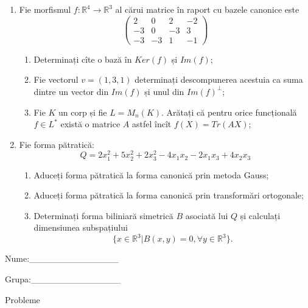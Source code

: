 \documentclass{article}
\begin{document}
\begin{enumerate}
 \item Fie morfismul $f:\mathbb{R}^4 \to \mathbb{R}^3$ al cărui matrice în raport cu bazele canonice este
$$\begin{pmatrix}
2&0&2&-2\\
-3&0&-3&3\\
-3&-3&1&-1
\end{pmatrix}$$

\begin{enumerate}
\item Determinați cîte o bază în $Ker(f)$ și $Im(f)$;
\item Fie vectorul $v=(1,3,1)$ determinați descompunerea acestuia ca suma dintre un vector din $Im(f)$ și unul din $Im(f)^\perp$;
\item Fie $K$ un corp și fie $L=M_n(K)$. Arătați că pentru orice funcțională $f \in L^*$ există o matrice $A$ astfel încît $f(X)=Tr(AX)$;
\end{enumerate}
\item Fie forma pătratică:
$$Q= 2x_1^2+5x_2^2+2x_3^2-4x_1x_2-2x_1x_3+4x_2x_3$$

\begin{enumerate}
\item Aduceți forma pătratică la forma canonică prin metoda Gauss;
\item Aduceți forma pătratică la forma canonică prin transformări ortogonale;
\item Determinați forma biliniară simetrică $B$ asociată lui $Q$ și calculați dimensiunea subspațiului
$$\{x \in \mathbb{R}^3 | B(x,y)=0,\forall y \in \mathbb{R}^3\}.$$

\end{enumerate}
\end{enumerate}
\newpage
\begin{flushright}
Nume:\_\_\_\_\_\_\_\_\_\_\_\_\_\_
 
 
Grupa:\_\_\_\_\_\_\_\_\_\_\_\_\_\_
\end{flushright}
\begin{center}
\vspace{2cm}
{\Large Probleme}
\vspace{2cm}
\end{center}
\end{document}
